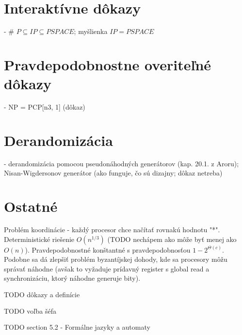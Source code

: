 \documentclass[12pt,a4paper]{article}
\begin{document}
\section{Interaktívne dôkazy}
 - \# $P \subseteq IP \subseteq PSPACE$; myšlienka $IP = PSPACE$
 

\section{Pravdepodobnostne overiteľné dôkazy}
 - NP = PCP[n3, 1] (dôkaz)
 

\section{Derandomizácia} 
- derandomizácia pomocou pseudonáhodných generátorov (kap. 20.1. z Aroru); Nisan-Wigdersonov generátor (ako funguje, čo sú dizajny; dôkaz netreba)

\section{Ostatné}
Problém koordinácie - každý procesor chce načítať rovnakú hodnotu "*". Deterministické riešenie $O(n^{1/3})$ (TODO nechápem ako môže byť menej ako $O(n)$). Pravdepodobnostné konštantné s pravdepodobnosťou $1 - 2^{\Theta(c)}$. Podobne sa dá zlepšiť problém byzantíjskej dohody, kde sa procesory môžu správať náhodne (avšak to vyžaduje prídavný register s global read a synchronizáciu, ktorý náhodne generuje bity). 

TODO dôkazy a definície

TODO voľba šéfa

TODO section 5.2 - Formálne jazyky a automaty 
\end{document}

